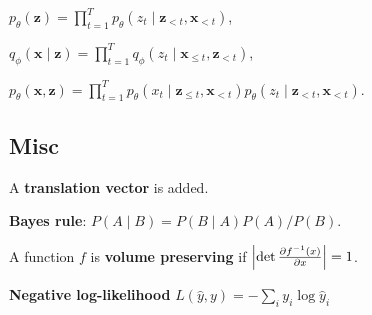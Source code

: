 \documentclass[11pt,landscape,a4paper,fleqn]{article}
\def\myvector#1{\mathbf{#1}}
\def\vx{{\myvector{x}}}
\def\vz{{\myvector{z}}}
\begin{document}
\begin{multicols*}{4}
$p_\theta(\vz) = \prod_{t = 1}^T p_\theta(z_t \mid \vz_{ < t}, \vx_{ < t})$,

$q_\phi(\vx \mid \vz) = \prod_{t = 1}^T q_\phi(z_t \mid \vx_{ \leq t}, \vz_{ < t})$,

$p_\theta(\vx, \vz) = \prod_{t = 1}^T p_\theta(x_t \mid \vz_{ \leq t}, \vx_{ < t})p_\theta(z_t \mid \vz_{ < t}, \vx_{ < t})$.

\subsection*{Misc}
A \textbf{translation vector} is added.

\textbf{Bayes rule}:
$P(A \mid B) = P(B \mid A)P(A) / P(B)$.

A function $f$ is \textbf{volume preserving} if $\left|\det \pdv{f^{-1}(x)}{x}\right| = 1$.

\textbf{Negative log-likelihood} $L(\hat{y}, y) = - \sum_i y_i \log \hat{y}_i$

\end{multicols*}
\end{document}
